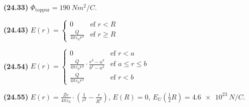 \begin{tcolorbox}
\begin{enumerate*}[label = \vspace{0.15cm} ]
  \item \textbf{(24.33)} $\Phi_{\text{toppur}} = \SI{190}{Nm^2/C}$.
  \item \textbf{(24.43)} $\displaystyle E(r) = \begin{cases} 0 & \text{ef $r<R$} \\[0.5pt] \frac{Q}{4\pi \varepsilon_0 r^2} & \text{ef $r \geq R$} \end{cases}$
  \item \textbf{(24.54)} $\displaystyle E(r) = \begin{cases} 0 & \text{ef $r < a$} \\[0.75pt] \frac{Q}{4\pi \varepsilon_0 r^2} \cdot \frac{r^3-a^3}{b^3-a^3} & \text{ef $a \leq r \leq b$} \\[0.75pt] \frac{Q}{4\pi \varepsilon_0 r^2} & \text{ef $r < b$} \end{cases}$
  \item \textbf{(24.55)} $E(r) = \frac{Ze}{4\pi \varepsilon_0} \cdot \left( \frac{1}{r^2} - \frac{r}{R^3} \right)$, $E(R) = 0$, $E_U(\frac{1}{2}R) = \SI{4.6e23}{N/C}$.
\end{enumerate*}
\end{tcolorbox}


\newpage